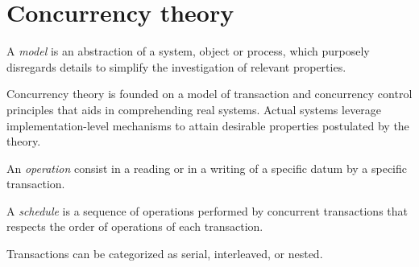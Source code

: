 \section{Concurrency theory}

\begin{definition}
    A \emph{model} is an abstraction of a system, object or process, which purposely disregards details to simplify the investigation of relevant properties. 
\end{definition}
Concurrency theory is founded on a model of transaction and concurrency control principles that aids in comprehending real systems.
Actual systems leverage implementation-level mechanisms to attain desirable properties postulated by the theory.
\begin{definition}
    An \emph{operation} consist in a reading or in a writing of a specific datum by a specific transaction. 

    A \emph{schedule} is a sequence of operations performed by concurrent transactions that respects the order of operations of each transaction. 
\end{definition}

Transactions can be categorized as serial, interleaved, or nested. 

